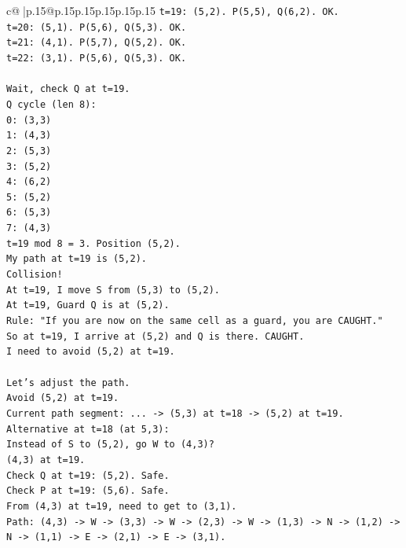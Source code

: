 \documentclass{article}
\begin{document}
{\begin{supertabular}{c@{$\;$}|p{.15\linewidth}@{}p{.15\linewidth}p{.15\linewidth}p{.15\linewidth}p{.15\linewidth}p{.15\linewidth}}
{{{\texttt{t=19: (5,2). P(5,5), Q(6,2). OK.} \\
\texttt{t=20: (5,1). P(5,6), Q(5,3). OK.} \\
\texttt{t=21: (4,1). P(5,7), Q(5,2). OK.} \\
\texttt{t=22: (3,1). P(5,6), Q(5,3). OK.} \\
\\ 
\texttt{Wait, check Q at t=19.} \\
\texttt{Q cycle (len 8):} \\
\texttt{0: (3,3)} \\
\texttt{1: (4,3)} \\
\texttt{2: (5,3)} \\
\texttt{3: (5,2)} \\
\texttt{4: (6,2)} \\
\texttt{5: (5,2)} \\
\texttt{6: (5,3)} \\
\texttt{7: (4,3)} \\
\texttt{t=19 mod 8 = 3. Position (5,2).} \\
\texttt{My path at t=19 is (5,2).} \\
\texttt{Collision!} \\
\texttt{At t=19, I move S from (5,3) to (5,2).} \\
\texttt{At t=19, Guard Q is at (5,2).} \\
\texttt{Rule: "If you are now on the same cell as a guard, you are CAUGHT."} \\
\texttt{So at t=19, I arrive at (5,2) and Q is there. CAUGHT.} \\
\texttt{I need to avoid (5,2) at t=19.} \\
\\ 
\texttt{Let's adjust the path.} \\
\texttt{Avoid (5,2) at t=19.} \\
\texttt{Current path segment: ... {-}> (5,3) at t=18 {-}> (5,2) at t=19.} \\
\texttt{Alternative at t=18 (at 5,3):} \\
\texttt{Instead of S to (5,2), go W to (4,3)?} \\
\texttt{(4,3) at t=19.} \\
\texttt{Check Q at t=19: (5,2). Safe.} \\
\texttt{Check P at t=19: (5,6). Safe.} \\
\texttt{From (4,3) at t=19, need to get to (3,1).} \\
\texttt{Path: (4,3) {-}> W {-}> (3,3) {-}> W {-}> (2,3) {-}> W {-}> (1,3) {-}> N {-}> (1,2) {-}> N {-}> (1,1) {-}> E {-}> (2,1) {-}> E {-}> (3,1).} \\
}}}
\end{supertabular}}
\end{document}
